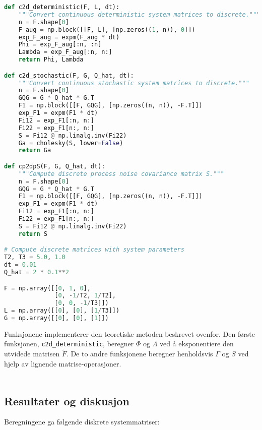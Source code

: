 \documentclass[a4paper,12pt]{article}
\theoremstyle{plain}
\begin{document}
\begin{lstlisting}[language=Python, caption=Implementasjon av diskretisering]
def c2d_deterministic(F, L, dt):
    """Convert continuous deterministic system matrices to discrete."""
    n = F.shape[0]
    F_aug = np.block([[F, L], [np.zeros((1, n)), 0]])
    exp_F_aug = expm(F_aug * dt)
    Phi = exp_F_aug[:n, :n]
    Lambda = exp_F_aug[:n, n:]
    return Phi, Lambda

def c2d_stochastic(F, G, Q_hat, dt):
    """Convert continuous stochastic system matrices to discrete."""
    n = F.shape[0]
    GQG = G * Q_hat * G.T
    F1 = np.block([[F, GQG], [np.zeros((n, n)), -F.T]])
    exp_F1 = expm(F1 * dt)
    Fi12 = exp_F1[:n, n:]
    Fi22 = exp_F1[n:, n:]
    S = Fi12 @ np.linalg.inv(Fi22)
    Ga = cholesky(S, lower=False)
    return Ga

def cp2dpS(F, G, Q_hat, dt):
    """Compute discrete process noise covariance matrix S."""
    n = F.shape[0]
    GQG = G * Q_hat * G.T
    F1 = np.block([[F, GQG], [np.zeros((n, n)), -F.T]])
    exp_F1 = expm(F1 * dt)
    Fi12 = exp_F1[:n, n:]
    Fi22 = exp_F1[n:, n:]
    S = Fi12 @ np.linalg.inv(Fi22)
    return S

# Compute discrete matrices with system parameters
T2, T3 = 5.0, 1.0
dt = 0.01
Q_hat = 2 * 0.1**2

F = np.array([[0, 1, 0],
              [0, -1/T2, 1/T2],
              [0, 0, -1/T3]])
L = np.array([[0], [0], [1/T3]])
G = np.array([[0], [0], [1]])
\end{lstlisting}
\clearpage
Funksjonene implementerer den teoretiske metoden beskrevet ovenfor. Den første funksjonen, \texttt{c2d\_deterministic}, beregner $\Phi$ og $\Lambda$ ved å eksponentiere den utvidede matrisen $\tilde{F}$. De to andre funksjonene beregner henholdsvis $\Gamma$ og $S$ ved hjelp av lignende matrise-operasjoner.
\\\\
\subsection{Resultater og diskusjon}
Beregningene ga følgende diskrete systemmatriser:
\end{document}
